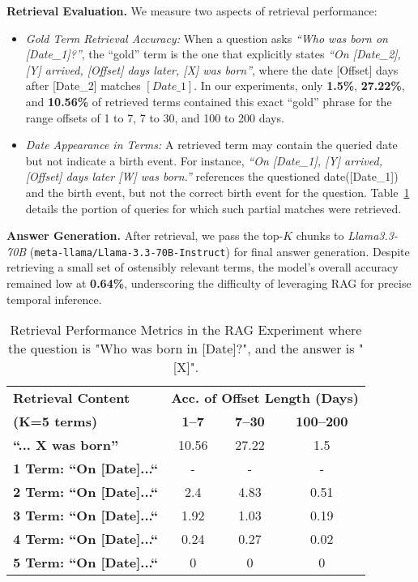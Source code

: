 \documentclass[11pt]{article}
\begin{document}
\vspace{0.5em}
\noindent \textbf{Retrieval Evaluation.} We measure two aspects of retrieval performance:
\begin{itemize}
    \item \textit{Gold Term Retrieval Accuracy:} When a question asks \emph{``Who was born on [Date\_1]?''}, the “gold” term is the one that explicitly states \emph{``On [Date\_2], [Y] arrived, [Offset] days later, [X] was born''}, where the date [Offset] days after [Date\_2] matches \([Date\_1]\). In our experiments, only \textbf{1.5\%}, \textbf{27.22\%}, and \textbf{10.56\%} of retrieved terms contained this exact “gold” phrase for the range offsets of 1 to 7, 7 to 30, and 100 to 200 days.
    \item \textit{Date Appearance in Terms:} A retrieved term may contain the queried date but not indicate a birth event. For instance, \emph{``On [Date\_1], [Y] arrived, [Offset] days later [W] was born.''} references the questioned date([Date\_1]) and the birth event, but not the correct birth event for the question. Table~\ref{tab:rag-retrieval} details the portion of queries for which such partial matches were retrieved.
\end{itemize}

\noindent \textbf{Answer Generation.} After retrieval, we pass the top-$K$ chunks to \emph{Llama3.3-70B} (\texttt{meta-llama/Llama-3.3-70B-Instruct}) for final answer generation. Despite retrieving a small set of ostensibly relevant terms, the model’s overall accuracy remained low at \textbf{0.64\%}, underscoring the difficulty of leveraging RAG for precise temporal inference.

\begin{table}[ht]
\centering
\caption{Retrieval Performance Metrics in the RAG Experiment where the question is "Who was born in [Date]?", and the answer is "[X]".}
\label{tab:rag-retrieval}
\begin{tabular}{l|ccc}
\hline
\textbf{Retrieval Content } & \multicolumn{3}{c}{\small{\textbf{Acc. of Offset Length (Days)}}} \\
\cline{2-4}
\small{\textbf{(K=5 terms)}}  & \textbf{1--7 }  & \textbf{7--30 } & \textbf{100--200 } \\
\hline
\textbf{``... X was born''} & 10.56 & 27.22 & 1.5 \\
\small{\textbf{1 Term: ``On [Date]...``}} & - & - & - \\
\small{\textbf{2 Term: ``On [Date]...``}} & 2.4 & 4.83 & 0.51 \\
\small{\textbf{3 Term: ``On [Date]...``}} & 1.92 & 1.03 & 0.19 \\
\small{\textbf{4 Term: ``On [Date]...``}} & 0.24 & 0.27 & 0.02 \\
\small{\textbf{5 Term: ``On [Date]...``}} & 0 & 0 & 0 \\
\hline
\end{tabular}
\end{table}
\end{document}
